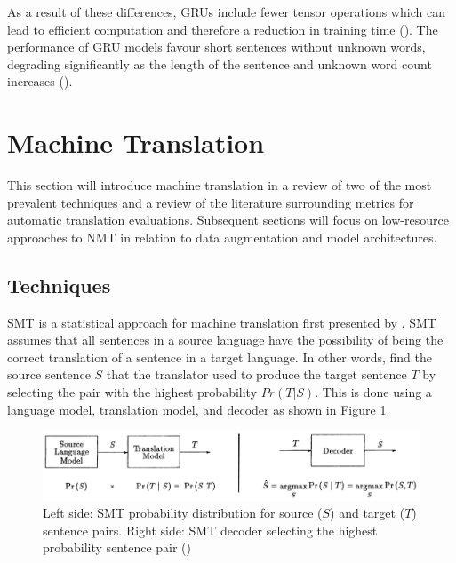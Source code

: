 As a result of these differences, \acrshort{GRU}s include fewer tensor operations which can lead to efficient computation and therefore a reduction in training time (\cite{chung_gru_2014}).
The performance of \acrshort{GRU} models favour short sentences without unknown words, degrading significantly as the length of the sentence and unknown word count increases (\cite{cho_properties_2014}).

\section{Machine Translation}
\label{Machine Translation}

This section will introduce machine translation in a review of two of the most prevalent techniques and a review of the literature surrounding metrics for automatic translation evaluations. Subsequent sections will focus on low-resource approaches to \acrshort{NMT} in relation to data augmentation and model architectures.

\subsection{Techniques}


\acrfull{SMT} is a statistical approach for machine translation first presented by \cite{brown_statistical_1990}. 
\acrshort{SMT} assumes that all sentences in a source language have the possibility of being the correct translation of a sentence in a target language. 
In other words, find the source sentence $S$ that the translator used to produce the target sentence $T$ by selecting the pair with the highest probability $Pr ( T | S )$.
This is done using a language model, translation model, and decoder as shown in Figure \ref{fig:smt_diagram}.

\begin{figure}[ht!]
\centering
\includegraphics[width=1\textwidth]{media/literature/machine_translation/smt_3.png}
\caption[Diagram of \acrshort{SMT} probability distribution and decoder]{Left side: \acrshort{SMT} probability distribution for source ($S$) and target ($T$) sentence pairs. Right side: \acrshort{SMT} decoder selecting the highest probability sentence pair (\cite{brown_statistical_1990})}
\label{fig:smt_diagram}
\end{figure}

